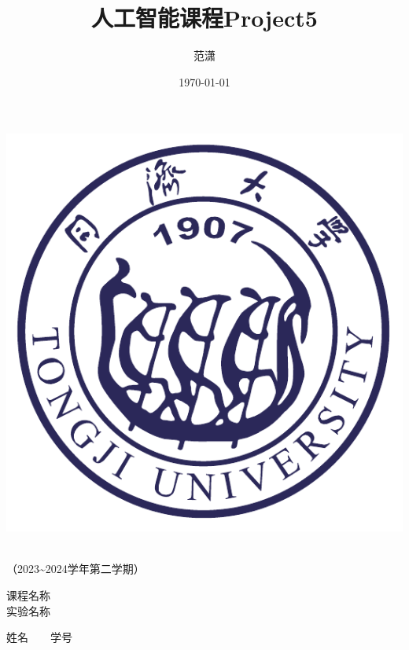 \documentclass[a4paper]{report}
\author{\Large{范潇\quad2254298}}
\title{\sffamily\Huge\bfseries{人工智能课程Project5}}
\date{\Large{\today}}
\begin{document}
\begin{titlepage}
    \heiti
    \vspace*{64pt}
    \begin{center}
        \includegraphics{./pic/tongji-logo-purple.pdf}

        \vspace*{36pt}
        \\
        \vspace*{48pt}
        \LARGE（2023\~{}2024学年第二学期）\\
        \vspace*{48pt}
    
        \LARGE 课程名称\ \ \underline{}\\
        \LARGE 实验名称\ \ \underline{}\\
        \vspace*{36pt}
    
        \Large 姓名\ \ \underline{}\ \ 学号\ \ \underline{}\\
    \end{center}
\end{titlepage}





% 

\end{document}
